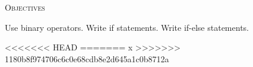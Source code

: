 


\renewcommand\TITLE{Assignment 6}
\usepackage{import}


\topmatter

\textsc{Objectives}
 \begin{myenum}
   \li Use binary operators.
   \li Write if statements.
   \li Write if-else statements.
 \end{myenum}
 

<<<<<<< HEAD
=======
x
>>>>>>> 1180b8f974706c6c0e68cdb8e2d645a1c0b8712a


